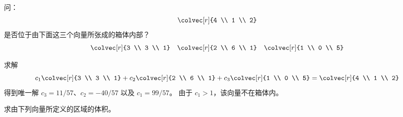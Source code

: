\begin{exercises}
  \item 
    问：\begin{equation*}
      \colvec[r]{4 \\ 1 \\ 2}
    \end{equation*}
    是否位于由下面这三个向量所张成的箱体内部？
    \begin{equation*}
      \colvec[r]{3 \\ 3 \\ 1}
      \quad
      \colvec[r]{2 \\ 6 \\ 1}
      \quad
      \colvec[r]{1 \\ 0 \\ 5}
    \end{equation*}
    \begin{answer}
      求解
      \begin{equation*}
        c_1\colvec[r]{3 \\ 3 \\ 1}
        +c_2\colvec[r]{2 \\ 6 \\ 1}
        +c_3\colvec[r]{1 \\ 0 \\ 5}
        =\colvec[r]{4 \\ 1 \\ 2}
      \end{equation*}
      得到唯一解
      \( c_3=11/57 \)、\( c_2=-40/57 \) 以及 \( c_1=99/57 \)。
      由于 \( c_1>1 \)，该向量不在箱体内。  
    \end{answer}
  \recommended \item 
    求由下列向量所定义的区域的体积。
\end{exercises}

